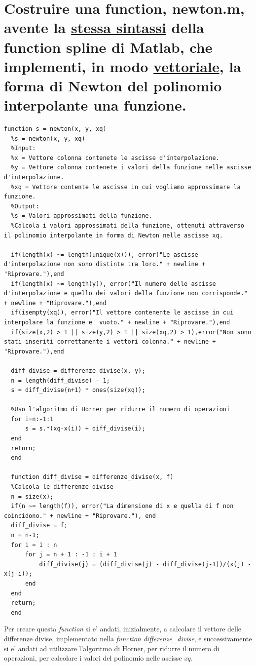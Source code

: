 \documentclass[10pt,a4paper]{article}
\begin{document}
\section{
  Costruire una function, \textbf{newton.m}, avente la \underline{stessa sintassi} della function \textbf{spline}
  di Matlab, che implementi, in modo \underline{vettoriale}, la forma di Newton del polinomio interpolante una
  funzione.
 }
 \begin{lstlisting}[style=Matlab-editor]
  function s = newton(x, y, xq)
  %s = newton(x, y, xq)
  %Input:
  %x = Vettore colonna contenete le ascisse d'interpolazione.
  %y = Vettore colonna contenete i valori della funzione nelle ascisse d'interpolazione.
  %xq = Vettore contente le ascisse in cui vogliamo approssimare la funzione.
  %Output:
  %s = Valori approssimati della funzione.
  %Calcola i valori approssimati della funzione, ottenuti attraverso il polinomio interpolante in forma di Newton nelle ascisse xq.
  
  if(length(x) ~= length(unique(x))), error("Le ascisse d'interpolazione non sono distinte tra loro." + newline + "Riprovare."),end 
  if(length(x) ~= length(y)), error("Il numero delle ascisse d'interpolazione e quello dei valori della funzione non corrisponde." + newline + "Riprovare."),end
  if(isempty(xq)), error("Il vettore contenente le ascisse in cui interpolare la funzione e' vuoto." + newline + "Riprovare."),end
  if(size(x,2) > 1 || size(y,2) > 1 || size(xq,2) > 1),error("Non sono stati inseriti correttamente i vettori colonna." + newline + "Riprovare."),end
  
  diff_divise = differenze_divise(x, y);
  n = length(diff_divise) - 1;
  s = diff_divise(n+1) * ones(size(xq));
  
  %Uso l'algoritmo di Horner per ridurre il numero di operazioni
  for i=n:-1:1
      s = s.*(xq-x(i)) + diff_divise(i);  
  end
  return;
  end
  
  function diff_divise = differenze_divise(x, f)
  %Calcola le differenze divise
  n = size(x);
  if(n ~= length(f)), error("La dimensione di x e quella di f non coincidono." + newline + "Riprovare."), end
  diff_divise = f;
  n = n-1;
  for i = 1 : n
      for j = n + 1 : -1 : i + 1
          diff_divise(j) = (diff_divise(j) - diff_divise(j-1))/(x(j) - x(j-i));
      end
  end
  return;
  end
\end{lstlisting}

Per creare questa \textit{function} si e' andati, inizialmente, a calcolare il
vettore delle differenze divise, implementato nella \textit{function differenze\_divise}, e
successivamente si e' andati ad utilizzare l'algoritmo di Horner, per ridurre
il numero di operazioni, per calcolare i valori del polinomio nelle ascisse \textit{xq}.
\end{document}

